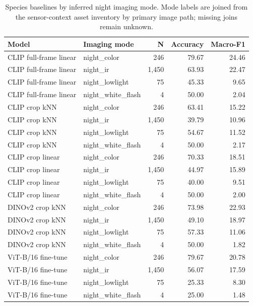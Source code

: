 \begin{table}[h]
\centering
\caption{Species baselines by inferred night imaging mode. Mode labels are joined from the sensor-context asset inventory by primary image path; missing joins remain unknown.}
\label{tab:species_imaging_breakdown_v1}
\small
\begin{tabular}{llrrr}
\toprule
Model & Imaging mode & N & Accuracy & Macro-F1 \\
\midrule
CLIP full-frame linear & night\_color & 246 & 79.67 & 24.46 \\
CLIP full-frame linear & night\_ir & 1,450 & 63.93 & 22.47 \\
CLIP full-frame linear & night\_lowlight & 75 & 45.33 & 9.65 \\
CLIP full-frame linear & night\_white\_flash & 4 & 50.00 & 2.04 \\
CLIP crop kNN & night\_color & 246 & 63.41 & 15.22 \\
CLIP crop kNN & night\_ir & 1,450 & 39.79 & 10.96 \\
CLIP crop kNN & night\_lowlight & 75 & 54.67 & 11.52 \\
CLIP crop kNN & night\_white\_flash & 4 & 50.00 & 2.17 \\
CLIP crop linear & night\_color & 246 & 70.33 & 18.51 \\
CLIP crop linear & night\_ir & 1,450 & 44.97 & 15.89 \\
CLIP crop linear & night\_lowlight & 75 & 40.00 & 9.51 \\
CLIP crop linear & night\_white\_flash & 4 & 50.00 & 2.00 \\
DINOv2 crop kNN & night\_color & 246 & 73.98 & 22.93 \\
DINOv2 crop kNN & night\_ir & 1,450 & 49.10 & 18.97 \\
DINOv2 crop kNN & night\_lowlight & 75 & 57.33 & 11.06 \\
DINOv2 crop kNN & night\_white\_flash & 4 & 50.00 & 1.82 \\
ViT-B/16 fine-tune & night\_color & 246 & 79.67 & 20.78 \\
ViT-B/16 fine-tune & night\_ir & 1,450 & 56.07 & 17.59 \\
ViT-B/16 fine-tune & night\_lowlight & 75 & 25.33 & 8.30 \\
ViT-B/16 fine-tune & night\_white\_flash & 4 & 25.00 & 1.48 \\
\bottomrule
\end{tabular}
\end{table}
